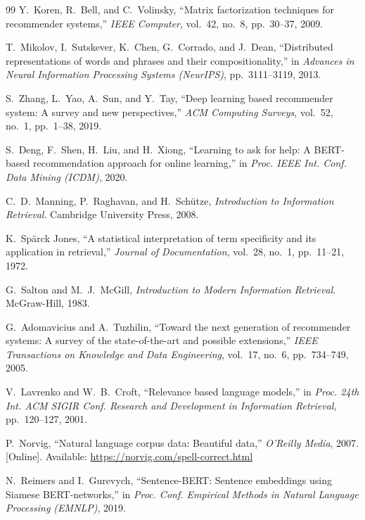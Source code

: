 \documentclass[12pt, a4paper]{article}
\begin{document}
\begin{thebibliography}{99}
Y.~Koren, R.~Bell, and C.~Volinsky,
``Matrix factorization techniques for recommender systems,''
\textit{IEEE Computer}, vol.~42, no.~8, pp.~30--37, 2009.

T.~Mikolov, I.~Sutskever, K.~Chen, G.~Corrado, and J.~Dean,
``Distributed representations of words and phrases and their compositionality,''
in \textit{Advances in Neural Information Processing Systems (NeurIPS)}, pp.~3111--3119, 2013.

S.~Zhang, L.~Yao, A.~Sun, and Y.~Tay,
``Deep learning based recommender system: A survey and new perspectives,''
\textit{ACM Computing Surveys}, vol.~52, no.~1, pp.~1--38, 2019.

S.~Deng, F.~Shen, H.~Liu, and H.~Xiong,
``Learning to ask for help: A BERT-based recommendation approach for online learning,''
in \textit{Proc. IEEE Int. Conf. Data Mining (ICDM)}, 2020.

C.~D.~Manning, P.~Raghavan, and H.~Sch\"{u}tze,
\textit{Introduction to Information Retrieval}.
Cambridge University Press, 2008.

K.~Sp\"{a}rck Jones,
``A statistical interpretation of term specificity and its application in retrieval,''
\textit{Journal of Documentation}, vol.~28, no.~1, pp.~11--21, 1972.

G.~Salton and M.~J.~McGill,
\textit{Introduction to Modern Information Retrieval}.
McGraw-Hill, 1983.

G.~Adomavicius and A.~Tuzhilin,
``Toward the next generation of recommender systems: A survey of the state-of-the-art and
possible extensions,''
\textit{IEEE Transactions on Knowledge and Data Engineering}, vol.~17, no.~6, pp.~734--749, 2005.

V.~Lavrenko and W.~B.~Croft,
``Relevance based language models,''
in \textit{Proc. 24th Int. ACM SIGIR Conf. Research and Development in Information Retrieval},
pp.~120--127, 2001.

P.~Norvig,
``Natural language corpus data: Beautiful data,''
\textit{O'Reilly Media}, 2007. [Online]. Available:
\url{https://norvig.com/spell-correct.html}

N.~Reimers and I.~Gurevych,
``Sentence-BERT: Sentence embeddings using Siamese \mbox{BERT-}networks,''
in \textit{Proc. Conf. Empirical Methods in Natural Language Processing (EMNLP)}, 2019.

\end{thebibliography}
\end{document}
